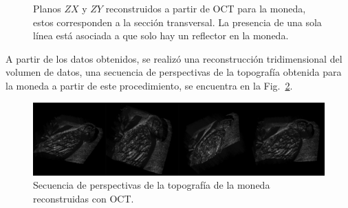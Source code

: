 \begin{figure}[h!]
	\centering
	\caption[Secciones transversales de la moneda]{Planos $ZX$ y $ZY$ reconstruidos a partir de OCT para la moneda, estos corresponden a la sección transversal. La presencia de una sola línea está asociada a que solo hay un reflector en la moneda.}
	\label{fig:monedabscan}
\end{figure}

A partir de los datos obtenidos, se realizó una reconstrucción tridimensional del volumen de datos, una secuencia de perspectivas de la topografía obtenida para la moneda a partir de este procedimiento, se encuentra en la Fig.~\ref{fig:PerspectivasTopologia}.




\begin{figure}
\centering
\includegraphics[width=1\linewidth]{img/chap2/PerspectivasTopologia}
\caption[Perspecivas de la topografía de la moneda.]{Secuencia de perspectivas de la topografía de la moneda reconstruidas con OCT.}
\label{fig:PerspectivasTopologia}
\end{figure}

